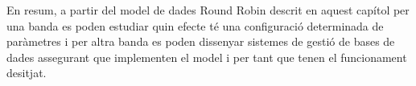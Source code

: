 En resum, a partir del model de dades Round Robin descrit en aquest capítol per una banda es poden estudiar quin efecte té una configuració determinada de paràmetres i per altra banda es poden dissenyar sistemes de gestió de bases de dades assegurant que implementen el model i per tant que tenen el funcionament desitjat.
















